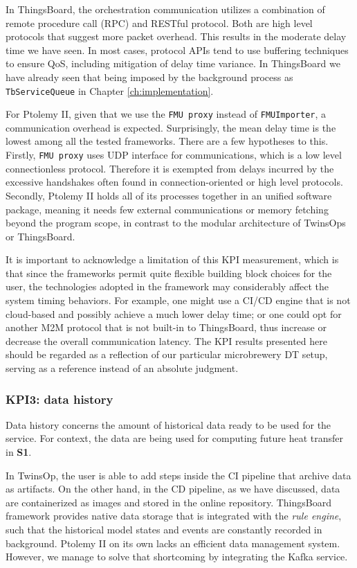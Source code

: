 In ThingsBoard, the orchestration communication utilizes a combination of remote procedure call (RPC) and RESTful protocol. Both are  high level protocols that suggest more packet overhead. This results in the moderate delay time we have seen. In most cases, protocol APIs tend to use buffering techniques to ensure QoS, including mitigation of delay time variance. In ThingsBoard we have already seen that being imposed by the background process as \texttt{TbServiceQueue} in Chapter \ref{ch:implementation}.

For Ptolemy II, given that we use the \texttt{FMU proxy} instead of \texttt{FMUImporter}, a communication overhead is expected. Surprisingly, the mean delay time is the lowest among all the tested frameworks. There are a few hypotheses to this. Firstly, \texttt{FMU proxy} uses UDP interface for communications, which is a low level connectionless protocol. Therefore it is exempted from delays incurred by the excessive handshakes often found in connection-oriented or high level protocols. Secondly, Ptolemy II holds all of its processes together in an unified software package, meaning it needs few external communications or memory fetching beyond the program scope, in contrast to the modular architecture of TwinsOps or ThingsBoard.

It is important to acknowledge a limitation of this KPI measurement, which is that since the frameworks permit quite flexible building block choices for the user, the technologies adopted in the framework may considerably affect the system timing behaviors. For example, one might use a CI/CD engine that is not cloud-based and possibly achieve a much lower delay time; or one could opt for another M2M protocol that is not built-in to ThingsBoard, thus increase or decrease the overall communication latency. The KPI results presented here should be regarded as a reflection of our particular microbrewery DT setup, serving as a reference instead of an absolute judgment.

\subsubsection{KPI3: data history}
Data history concerns the amount of historical data ready to be used for the service. For context, the data are being used for computing future heat transfer in \textbf{S1}.

In TwinsOp, the user is able to add steps inside the CI pipeline that archive data as artifacts. On the other hand, in the CD pipeline, as we have discussed, data are containerized as images and stored in the online repository. ThingsBoard framework provides native data storage that is integrated with the \textit{rule engine}, such that the historical model states and events are constantly recorded in background. Ptolemy II on its own lacks an efficient data management system. However, we manage to solve that shortcoming by integrating the Kafka service.

